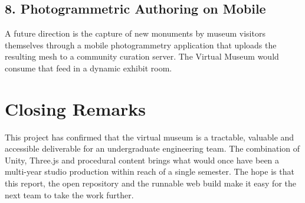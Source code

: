 \subsection{8. Photogrammetric Authoring on Mobile}

A future direction is the capture of new monuments by museum visitors themselves through a mobile photogrammetry application that uploads the resulting mesh to a community curation server. The Virtual Museum would consume that feed in a dynamic exhibit room.

\section{Closing Remarks}

This project has confirmed that the virtual museum is a tractable, valuable and accessible deliverable for an undergraduate engineering team. The combination of Unity, Three.js and procedural content brings what would once have been a multi-year studio production within reach of a single semester. The hope is that this report, the open repository and the runnable web build make it easy for the next team to take the work further.
